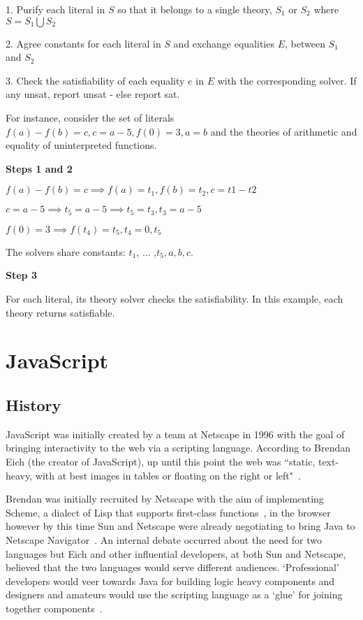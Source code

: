 \documentclass[]{final_report}
\begin{document}
1. Purify each literal in $S$ so that it belongs to a single theory, $S_1$ or $S_2$ where $S = S_1 \bigcup S_2$

2. Agree constants for each literal in $S$ and exchange equalities $E$, between $S_1$ and $S_2$

3. Check the satisfiability of each equality $e$ in $E$ with the corresponding solver. If any unsat, report unsat - else report sat.

For instance, consider the set of literals $f(a) - f(b) = c, c = a -5, f(0) = 3, a = b$ and the theories of arithmetic and equality of uninterpreted functions.

\textbf{Steps 1 and 2}

$f(a) - f(b) = c \implies f(a) = t_1, f(b) = t_2, c = t1 - t2$

$c = a - 5 \implies t_5 = a - 5 \implies t_5 = t_3, t_3 = a- 5$

$f(0) =3 \implies f(t_4) = t_5, t_4 = 0, t_5$

The solvers share constants: $t_1$, ... ,$t_5, a, b, c$.

\textbf{Step 3}

For each literal, its theory solver checks the satisfiability. In this example, each theory returns satisfiable.

\chapter{JavaScript}

\section{History}

JavaScript was initially created by a team at Netscape in 1996 with the goal of bringing interactivity to the web via a scripting language. According to Brendan Eich (the creator of JavaScript), up until this point the web was ``static, text-heavy, with at best images in tables or floating on the right or left"~\cite{AZProgrammingLanguages}. 

Brendan was initially recruited by Netscape with the aim of implementing Scheme, a dialect of Lisp that supports first-class functions~\cite{dybvig1996scheme}, in the browser however by this time Sun and Netscape were already negotiating to bring Java to Netscape Navigator~\cite{popularityofjavascript}. An internal debate occurred about the need for two languages but Eich and other influential developers, at both Sun and Netscape, believed that the two languages would serve different audiences. `Professional' developers would veer towards Java for building logic heavy components and designers and amateurs would use the scripting language as a `glue' for joining together components~\cite{AZProgrammingLanguages}.
\end{document}
